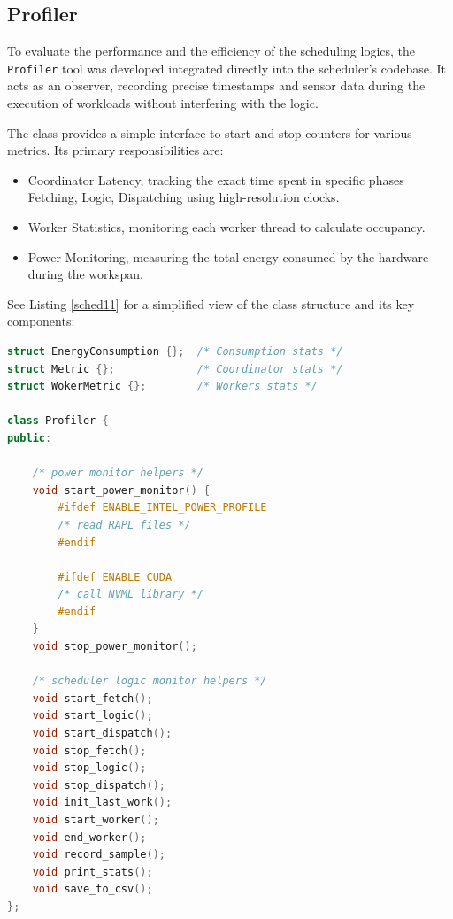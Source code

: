 \clearpage

\subsection{Profiler}
\label{implprofiler}
To evaluate the performance and the efficiency of the scheduling logics, the \texttt{Profiler} tool was developed integrated directly into the scheduler's codebase. It acts as an observer, recording precise timestamps and sensor data during the execution of workloads without interfering with the logic. 

The class provides a simple interface to start and stop counters for various metrics. Its primary responsibilities are: 

\begin{itemize} 
    \item Coordinator Latency, tracking the exact time spent in specific phases Fetching, Logic, Dispatching using high-resolution clocks. 

    \item Worker Statistics, monitoring each worker thread to calculate occupancy.

    \item Power Monitoring, measuring the total energy consumed by the hardware during the workspan. 
\end{itemize}

See Listing \ref{sched11} for a simplified view of the class structure and its key components:

\begin{lstlisting}[caption={Profiler Class Structure}, language=C++,label={sched11}] 
struct EnergyConsumption {};  /* Consumption stats */
struct Metric {};             /* Coordinator stats */
struct WokerMetric {};        /* Workers stats */

class Profiler { 
public: 

    /* power monitor helpers */
    void start_power_monitor() {
        #ifdef ENABLE_INTEL_POWER_PROFILE
        /* read RAPL files */
        #endif
    
        #ifdef ENABLE_CUDA
        /* call NVML library */
        #endif
    }
    void stop_power_monitor();
    
    /* scheduler logic monitor helpers */
    void start_fetch();
    void start_logic();
    void start_dispatch();
    void stop_fetch();
    void stop_logic();
    void stop_dispatch();
    void init_last_work();
    void start_worker();
    void end_worker();
    void record_sample();
    void print_stats();
    void save_to_csv();
}; 
\end{lstlisting}

